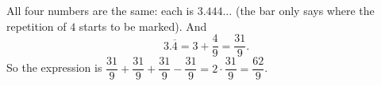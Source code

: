 All four numbers are the same: each is $3.444\ldots$ (the bar only says where the repetition of $4$ starts to be marked). And
\[3.\overline4=3+\dfrac{4}{9}=\dfrac{31}{9}.\]
So the expression is $\dfrac{31}{9}+\dfrac{31}{9}+\dfrac{31}{9}-\dfrac{31}{9}=2\cdot\dfrac{31}{9}=\boxed{\dfrac{62}{9}}$.
